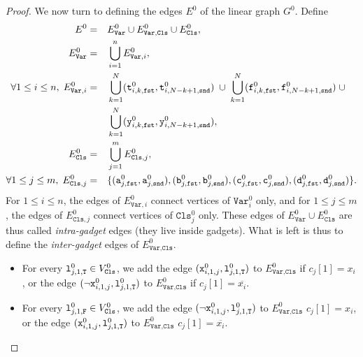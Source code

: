 \begin{proof}
    We now turn to defining the edges $E^{0}$ of the linear graph $G^{0}$.
    Define
    \begin{alignat*}{2}
      E^{0} &=&& E^{0}_{\texttt{Var}} \cup E^{0}_{\texttt{Var},\texttt{Cls}} \cup E^{0}_{\texttt{Cls}},
      \\
      E^{0}_{\texttt{Var}} &=&& \bigcup_{i=1}^{n} E^{0}_{\texttt{Var}, i},
      \\
      \forall 1\leq i \leq n,\;
      E^{0}_{\texttt{Var}, i} &=&&
      \bigcup_{k=1}^{N} (\texttt{t}^{0}_{i,k,\texttt{fst}}, \texttt{t}^{0}_{i,N-k+1,\texttt{snd}})
      \;\cup\;
      \bigcup_{k=1}^{N} (\texttt{f}^{0}_{i,k,\texttt{fst}}, \texttt{f}^{0}_{i,N-k+1,\texttt{snd}}) \;\cup
      \\
      &&&
      \bigcup_{k=1}^{N} (\texttt{y}^{0}_{i,k,\texttt{fst}}, \texttt{y}^{0}_{i,N-k+1,\texttt{snd}}),
      \\
      E^{0}_{\texttt{Cls}} &=&& \bigcup_{j=1}^{m} E^{0}_{\texttt{Cls}, j},
      \\
      \forall 1\leq j \leq m,\;
      E^{0}_{\texttt{Cls}, j} &=&&
      \{(\texttt{a}^{0}_{j,\texttt{fst}}, \texttt{a}^{0}_{j,\texttt{snd}}),
      (\texttt{b}^{0}_{j,\texttt{fst}}, \texttt{b}^{0}_{j,\texttt{snd}}),
      (\texttt{c}^{0}_{j,\texttt{fst}}, \texttt{c}^{0}_{j,\texttt{snd}}),
      (\texttt{d}^{0}_{j,\texttt{fst}}, \texttt{d}^{0}_{j,\texttt{snd}})\}\text{.}
    \end{alignat*}
    For $1 \leq i \leq n$, the edges of $E^{0}_{\texttt{Var}, i}$ connect
    vertices of $\texttt{Var}^{0}_{i}$ only, and
    for $1 \leq j \leq m$, the edges of $E^{0}_{\texttt{Cls}, j}$ connect
    vertices of $\texttt{Cls}^{0}_{j}$ only.
    These edges of $E^{0}_{\texttt{Var}} \cup E^{0}_{\texttt{Cls}}$ are thus called
    \emph{intra-gadget} edges (they live inside gadgets).
    What is left is thus to define the \emph{inter-gadget} edges of
    $E^{0}_{\texttt{Var},\texttt{Cls}}$.
    \begin{itemize}
      \item
      For every $\texttt{l}^{0}_{j, 1, \texttt{T}} \in V^{0}_{\texttt{Cls}}$,
      we add
      the edge $(\texttt{x}^{0}_{i,1,j}, \texttt{l}^{0}_{j, 1, \texttt{T}})$
      to $E^{0}_{\texttt{Var},\texttt{Cls}}$
      if $c_{j}[1] = x_{i}$, or
      the edge $(\neg\texttt{x}^{0}_{i,1,j}, \texttt{l}^{0}_{j, 1, \texttt{T}})$
      to $E^{0}_{\texttt{Var},\texttt{Cls}}$
      if $c_{j}[1] = \overline{x_{i}}$.

      \item
      For every $\texttt{l}^{0}_{j, 1, \texttt{F}} \in V^{0}_{\texttt{Cls}}$,
      we add
      the edge $(\neg\texttt{x}^{0}_{i,1,j}, \texttt{l}^{0}_{j, 1, \texttt{T}})$
      to $E^{0}_{\texttt{Var},\texttt{Cls}}$
      $c_{j}[1] = x_{i}$, or
      the edge $(\texttt{x}^{0}_{i,1,j}, \texttt{l}^{0}_{j, 1, \texttt{T}})$
      to $E^{0}_{\texttt{Var},\texttt{Cls}}$
      $c_{j}[1] = \overline{x_{i}}$.


\end{itemize}
\end{proof}
